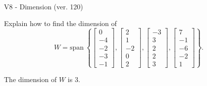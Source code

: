 \begin{exercise}
  \begin{exerciseTitle}V8 - Dimension (ver. 120)\end{exerciseTitle}
  \begin{exerciseStatement}
    Explain how to find the dimension of 
\[W=\mathrm{span}\ \left\{\left[\begin{array}{r}
0 \\
-4 \\
-2 \\
-3 \\
-1
\end{array}\right] , \left[\begin{array}{r}
2 \\
1 \\
-2 \\
0 \\
2
\end{array}\right] , \left[\begin{array}{r}
-3 \\
3 \\
2 \\
2 \\
3
\end{array}\right] , \left[\begin{array}{r}
7 \\
-1 \\
-6 \\
-2 \\
1
\end{array}\right]\right\}.\]



  \end{exerciseStatement}
  \begin{exerciseAnswer}
   The dimension of \(W\) is  \(3\).
  


  \end{exerciseAnswer}
\end{exercise}